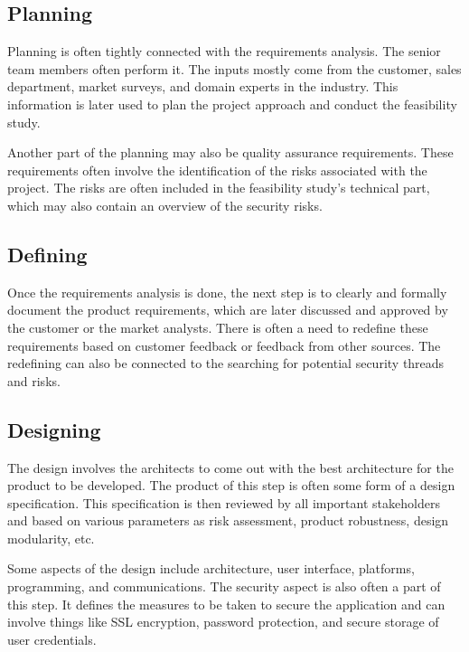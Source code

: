\documentclass[12pt,a4,twoside]{article}
\begin{document}
\subsection{Planning}

Planning is often tightly connected with the requirements analysis. The senior team members often perform it. The inputs mostly come from the customer, sales department, market surveys, and domain experts in the industry. This information is later used to plan the project approach and conduct the feasibility study. \cite{sdlc_tutorials_point}

Another part of the planning may also be quality assurance requirements. These requirements often involve the identification of the risks associated with the project. The risks are often included in the feasibility study's technical part, which may also contain an overview of the security risks. \cite{sdlc_tutorials_point}

\subsection{Defining}

Once the requirements analysis is done, the next step is to clearly and formally document the product requirements, which are later discussed and approved by the customer or the market analysts. There is often a need to redefine these requirements based on customer feedback or feedback from other sources. The redefining can also be connected to the searching for potential security threads and risks. \cite{sdlc_tutorials_point}

\subsection{Designing}

The design involves the architects to come out with the best architecture for the product to be developed. The product of this step is often some form of a design specification. This specification is then reviewed by all important stakeholders and based on various parameters as risk assessment, product robustness, design modularity, etc. \cite{sdlc_tutorials_point}

Some aspects of the design include architecture, user interface, platforms, programming, and communications. The security aspect is also often a part of this step. It defines the measures to be taken to secure the application and can involve things like SSL encryption, password protection, and secure storage of user credentials. \cite{sdlc_phoenix}
\end{document}
